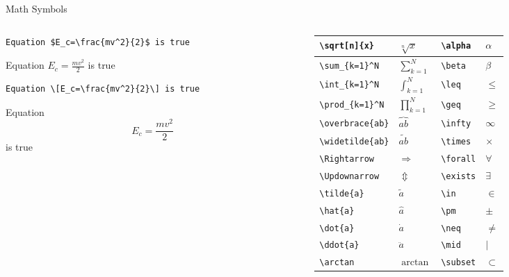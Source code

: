 \documentclass{beamer}
\begin{document}
\begin{frame}[fragile]{Math Symbols}
\begin{columns}
\begin{column}{4.5cm}
\begin{lstlisting}
Equation $E_c=\frac{mv^2}{2}$ is true
\end{lstlisting}

\begin{block}{}
Equation $E_c=\frac{mv^2}{2}$ is true
\end{block}
\vspace{0.5cm}
\begin{lstlisting}
Equation \[E_c=\frac{mv^2}{2}\] is true
\end{lstlisting}

\begin{block}{}
Equation \[E_c=\frac{mv^2}{2}\] is true
\end{block}
\end{column}
\begin{column}{5.5cm}
\begin{center}
\scriptsize
\begin{tabular}{| l l | l l|}
\hline
\verb!\sqrt[n]{x}! & $\sqrt[n]{x}$ & \verb!\alpha! & $\alpha$
\\
\hline
\verb!\sum_{k=1}^N! & $\sum_{k=1}^N$ & \verb!\beta! & $\beta$
\\
\hline
\verb!\int_{k=1}^N! & $\int_{k=1}^N$ & \verb!\leq! & $\leq$
\\
\hline
\verb!\prod_{k=1}^N! & $\prod_{k=1}^N$ & \verb!\geq! & $\geq$
\\
\hline
\verb!\overbrace{ab}! & $\overbrace{ab}$ & \verb!\infty! & $\infty$
\\
\hline
\verb!\widetilde{ab}! & $\widetilde{ab}$ & \verb!\times! & $\times$
\\
\hline
\verb!\Rightarrow! & $\Rightarrow$ & \verb!\forall! & $\forall$
\\
\hline
\verb!\Updownarrow! & $\Updownarrow$ & \verb!\exists! & $\exists$
\\
\hline
\verb!\tilde{a}! & $\tilde{a}$ & \verb!\in! & $\in$
\\
\hline
\verb!\hat{a}! & $\hat{a}$ & \verb!\pm! & $\pm$
\\
\hline
\verb!\dot{a}! & $\dot{a}$ & \verb!\neq! & $\neq$ \\
\hline
\verb!\ddot{a}! & $\ddot{a}$ & \verb!\mid! & $\mid$
\\
\hline
\verb!\arctan! & $\arctan$ & \verb!\subset! & $\subset$
\\

\end{tabular}
\end{center}
\end{column}
\end{columns}
\end{frame}
\end{document}

